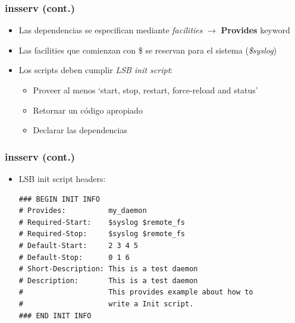\begin{frame}
  \frametitle{\textbf{insserv} (cont.)}
  \begin{itemize}
		\item Las dependencias se especifican mediante \textit{facilities} $\rightarrow$ \textbf{Provides} keyword
		\item Las facilities que comienzan con \$ se reservan para el sistema (\textit{\$syslog})
		\item Los scripts deben cumplir \textit{LSB init script}:
		\begin{itemize}
			\item Proveer al menos `start, stop, restart, force-reload and status'
			\item Retornar un código apropiado
			\item Declarar las dependencias
		\end{itemize}
  \end{itemize}
\end{frame}

\begin{frame}[fragile]
  \frametitle{\textbf{insserv} (cont.)}
  \begin{itemize}
	  	\item LSB init script headers:
		\begin{lstlisting}
### BEGIN INIT INFO
# Provides:          my_daemon
# Required-Start:    $syslog $remote_fs
# Required-Stop:     $syslog $remote_fs
# Default-Start:     2 3 4 5
# Default-Stop:      0 1 6
# Short-Description: This is a test daemon
# Description:       This is a test daemon
#                    This provides example about how to
#                    write a Init script.
### END INIT INFO
		\end{lstlisting}
  \end{itemize}
\end{frame}

